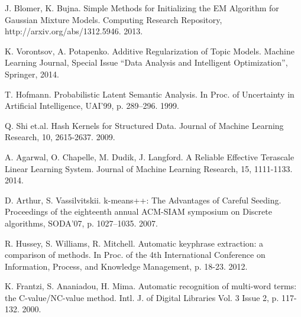 \documentclass{sig-alternate-2013}
\begin{document}
\begin{thebibliography}{1}
J. Blomer, K. Bujna.
Simple Methods for Initializing the EM Algorithm for Gaussian Mixture Models.
Computing Research Repository, http://arxiv.org/abs/1312.5946. 2013.

K. Vorontsov, A. Potapenko.
Additive Regularization of Topic Models.
Machine Learning Journal, Special Issue ``Data Analysis and Intelligent Optimization'', Springer, 2014.

T. Hofmann.
Probabilistic Latent Semantic Analysis.
In Proc. of Uncertainty in Artificial Intelligence, UAI'99, p. 289--296. 1999.

Q. Shi et.al.
Hash Kernels for Structured Data.
Journal of Machine Learning Research, 10, 2615-2637. 2009.

A. Agarwal, O. Chapelle, M. Dudik, J. Langford.
A Reliable Effective Terascale Linear Learning System.
Journal of Machine Learning Research, 15, 1111-1133. 2014.

D. Arthur, S. Vassilvitskii.
k-means++: The Advantages of Careful Seeding.
Proceedings of the eighteenth annual ACM-SIAM symposium on Discrete algorithms, SODA'07, p. 1027--1035. 2007.

R. Hussey, S. Williams, R. Mitchell.
Automatic keyphrase extraction: a comparison of methods.
In Proc. of the 4th International Conference on Information, Process, and Knowledge Management, p. 18-23. 2012.

K. Frantzi, S. Ananiadou, H. Mima.
Automatic recognition of multi-word terms: the C-value/NC-value method.
Intl. J. of Digital Libraries Vol. 3 Issue 2, p. 117-132. 2000.

\end{thebibliography}
\end{document}
